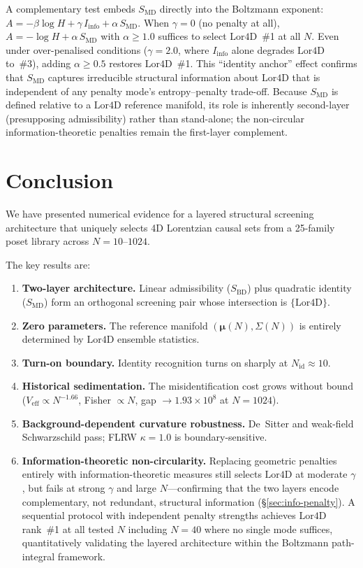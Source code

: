\documentclass[12pt,a4paper]{article}
\newcommand{\SBD}{S_{\mathrm{BD}}}
\newcommand{\SMD}{S_{\mathrm{MD}}}
\newcommand{\Lor}{\mathrm{Lor4D}}
\newcommand{\Veff}{V_{\mathrm{eff}}}
\begin{document}
A complementary test embeds $\SMD$ directly into the Boltzmann exponent:
$A = -\beta\log H + \gamma\,I_{\mathrm{info}} + \alpha\,\SMD$.
When $\gamma=0$ (no penalty at all), $A=-\log H + \alpha\,\SMD$ with
$\alpha\geq 1.0$ suffices to select $\Lor$~\#1 at all $N$.
Even under over-penalised conditions ($\gamma=2.0$, where $I_{\mathrm{info}}$
alone degrades $\Lor$ to~\#3), adding $\alpha\geq 0.5$ restores $\Lor$~\#1.
This ``identity anchor'' effect confirms that $\SMD$ captures irreducible
structural information about $\Lor$ that is independent of any penalty
mode's entropy--penalty trade-off.
Because $\SMD$ is defined relative to a $\Lor$ reference manifold, its role is
inherently second-layer (presupposing admissibility) rather than stand-alone;
the non-circular information-theoretic penalties remain the first-layer
complement.

\section{Conclusion}
\label{sec:conclusion}

We have presented numerical evidence for a layered structural screening
architecture that uniquely selects 4D Lorentzian causal sets from a 25-family
poset library across $N=10$--$1024$.

The key results are:
\begin{enumerate}
\item \textbf{Two-layer architecture.}
  Linear admissibility ($\SBD$) plus quadratic identity ($\SMD$) form an
  orthogonal screening pair whose intersection is $\{\Lor\}$.
\item \textbf{Zero parameters.}
  The reference manifold $(\bm{\mu}(N),\Sigma(N))$ is entirely determined by
  $\Lor$ ensemble statistics.
\item \textbf{Turn-on boundary.}
  Identity recognition turns on sharply at $N_{\mathrm{id}}\approx 10$.
\item \textbf{Historical sedimentation.}
  The misidentification cost grows without bound
  ($\Veff\propto N^{-1.66}$, Fisher $\propto N$,
  gap $\to 1.93\times 10^8$ at $N=1024$).
\item \textbf{Background-dependent curvature robustness.}
  De~Sitter and weak-field Schwarzschild pass; FLRW $\kappa=1.0$ is
  boundary-sensitive.
\item \textbf{Information-theoretic non-circularity.}
  Replacing geometric penalties entirely with information-theoretic measures
  still selects $\Lor$ at moderate $\gamma$, but fails at strong $\gamma$
  and large $N$---confirming that the two layers encode complementary, not
  redundant, structural information (\S\ref{sec:info-penalty}).
  A sequential protocol with independent penalty strengths achieves $\Lor$
  rank~\#1 at all tested $N$ including $N=40$ where no single mode suffices,
  quantitatively validating the layered architecture within the Boltzmann
  path-integral framework.
\end{enumerate}
\end{document}

